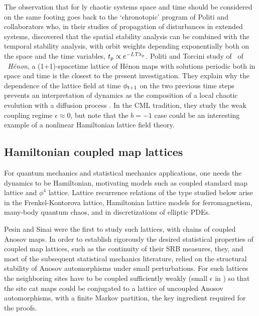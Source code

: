 The observation that for {\spt}ly chaotic systems space and time should
be considered on the same footing goes back to the `chronotopic' program
of Politi and collaborators
who, in their studies of propagation of {\spt} disturbances in extended
systems, discovered that the spatial stability analysis can be combined
with the temporal stability analysis, with orbit weights depending
exponentially both on the space and the time variables,
$t_p\propto{e^{-{\ensuremath{L_{}}}{\ensuremath{T_{}}}\lambda_p}}$.
Politi and
Torcini study of \twots\ of \emph{\spt\ H{\'e}non}, a
(1+1)-spacetime lattice of H{\'e}non maps with solutions periodic
both in space and time is the closest to the present investigation.
They explain why the dependence
of the lattice field at time $\phi_{t + 1}$ on the two previous time
steps prevents an interpretation of dynamics as the composition of a
local chaotic evolution with a diffusion process .
In the CML tradition, they study the weak coupling regime $\epsilon\approx0$, but note that the
$b=-1$ case could be an interesting example of a nonlinear Hamiltonian
lattice field theory.


\subsection{Hamiltonian coupled map lattices}
\label{s:HCCMs}

For quantum
mechanics and statistical mechanics applications, one needs the dynamics to
be Hamiltonian, motivating models such as coupled standard map
lattice and
$\phi^4$ lattice.
%
Lattice recurrence relations of the type studied below arise
in the Frenkel-Kontorova lattice, Hamiltonian lattice models for
ferromagnetism, many-body quantum chaos, and in discretizations of elliptic PDEs.


Pesin and Sinai were the first to study such lattices, with
chains of coupled Anosov maps.
In order to establish rigorously the desired statistical
properties of coupled map lattices, such as the continuity of their {SRB}
measures, they, and most of the subsequent statistical mechanics literature,
relied on the structural stability of Anosov automorphisms under small
perturbations. For such lattices the neighboring sites have to be coupled
sufficiently weakly (small $\epsilon$ in ) so that the site
cat maps could be conjugated to a lattice of uncoupled Anosov automorphisms,
with a finite Markov partition, the key ingredient required for the proofs.


